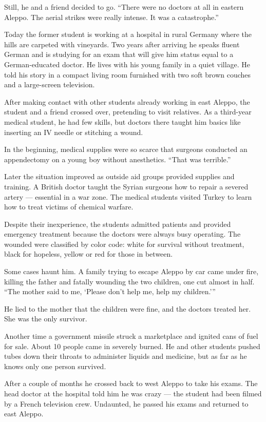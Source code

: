 Still, he and a friend decided to go. ``There were no doctors at all in
eastern Aleppo. The aerial strikes were really intense. It was a
catastrophe.''

Today the former student is working at a hospital in rural Germany where
the hills are carpeted with vineyards. Two years after arriving he
speaks fluent German and is studying for an exam that will give him
status equal to a German-educated doctor. He lives with his young family
in a quiet village. He told his story in a compact living room furnished
with two soft brown couches and a large-screen television.

After making contact with other students already working in east Aleppo,
the student and a friend crossed over, pretending to visit relatives. As
a third-year medical student, he had few skills, but doctors there
taught him basics like inserting an IV needle or stitching a wound.

In the beginning, medical supplies were so scarce that surgeons
conducted an appendectomy on a young boy without anesthetics. ``That was
terrible.''

Later the situation improved as outside aid groups provided supplies and
training. A British doctor taught the Syrian surgeons how to repair a
severed artery --- essential in a war zone. The medical students visited
Turkey to learn how to treat victims of chemical warfare.

Despite their inexperience, the students admitted patients and provided
emergency treatment because the doctors were always busy operating. The
wounded were classified by color code: white for survival without
treatment, black for hopeless, yellow or red for those in between.

Some cases haunt him. A family trying to escape Aleppo by car came under
fire, killing the father and fatally wounding the two children, one cut
almost in half. ``The mother said to me, `Please don't help me, help my
children.'''

He lied to the mother that the children were fine, and the doctors
treated her. She was the only survivor.

Another time a government missile struck a marketplace and ignited cans
of fuel for sale. About 10 people came in severely burned. He and other
students pushed tubes down their throats to administer liquids and
medicine, but as far as he knows only one person survived.

After a couple of months he crossed back to west Aleppo to take his
exams. The head doctor at the hospital told him he was crazy --- the
student had been filmed by a French television crew. Undaunted, he
passed his exams and returned to east Aleppo.

